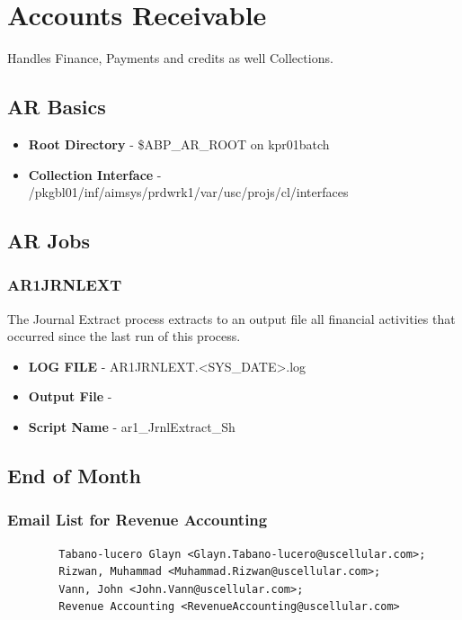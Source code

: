 \documentclass[12pt,twoside]{article}
\begin{document}
\newpage
\section{Accounts Receivable}
\label{sec-11}

  Handles Finance, Payments and credits as well Collections. 
\subsection{AR Basics}
\label{sec-11-1}

\begin{itemize}
\item \textbf{Root Directory} - \$ABP\_AR\_ROOT on kpr01batch
\item \textbf{Collection Interface} - /pkgbl01/inf/aimsys/prdwrk1/var/usc/projs/cl/interfaces
\end{itemize}
\subsection{AR Jobs}
\label{sec-11-2}
\subsubsection{AR1JRNLEXT}
\label{sec-11-2-1}

    The Journal Extract process extracts to an output file all financial activities that occurred since the last run of this process.
\begin{itemize}
\item \textbf{LOG FILE} - AR1JRNLEXT.<SYS\_DATE>.log
\item \textbf{Output File} -
\item \textbf{Script Name} - ar1\_JrnlExtract\_Sh
\end{itemize}
\subsection{End of Month}
\label{sec-11-3}
\subsubsection{Email List for Revenue Accounting}
\label{sec-11-3-1}

\begin{verbatim}
        Tabano-lucero Glayn <Glayn.Tabano-lucero@uscellular.com>; 
        Rizwan, Muhammad <Muhammad.Rizwan@uscellular.com>; 
        Vann, John <John.Vann@uscellular.com>;
        Revenue Accounting <RevenueAccounting@uscellular.com>
\end{verbatim}
\end{document}
